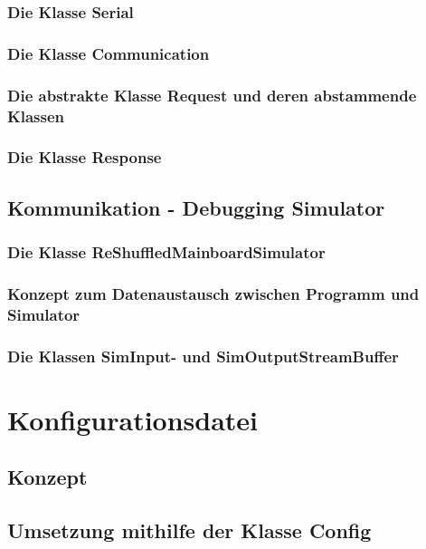 \subsubsection{Die Klasse Serial}
\subsubsection{Die Klasse Communication}
\subsubsection{Die abstrakte Klasse Request und deren abstammende Klassen}
\subsubsection{Die Klasse Response}

\subsection{Kommunikation - Debugging Simulator}

\subsubsection{Die Klasse ReShuffledMainboardSimulator}
\subsubsection{Konzept zum Datenaustausch zwischen Programm und Simulator}

\subsubsection{Die Klassen SimInput- und SimOutputStreamBuffer}
\section{Konfigurationsdatei}
\label{sec:config}
\subsection{Konzept}
\subsection{Umsetzung mithilfe der Klasse Config}
